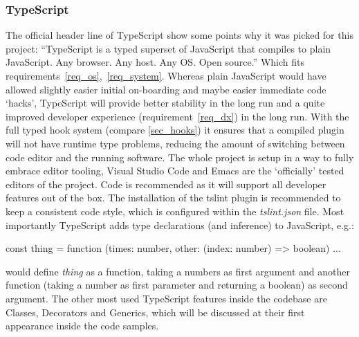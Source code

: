 \subsubsection*{TypeScript}
 The official header line of TypeScript show some points why
  it was picked for this project: ``TypeScript is a typed superset of JavaScript that compiles
  to plain JavaScript. Any browser. Any host. Any OS\@. Open
  source.''\cite{noauthor_typescript_2018} Which fits
  requirements~\ref{req_os},~\ref{req_system}. Whereas plain JavaScript would
  have allowed slightly easier initial on-boarding and maybe easier immediate
  code `hacks', TypeScript will provide better stability in the long run and a
  quite improved developer experience (requirement~\ref{req_dx}) in the long
  run. With the full typed hook system (compare \autoref{sec_hooks}) it ensures
  that a compiled plugin will not have runtime type problems, reducing the
  amount of switching between code editor and the running software. The whole
  project is setup in a way to fully embrace editor tooling, Visual Studio
  Code\cite *{noauthor_visual_nodate} and Emacs\cite*{noauthor_gnu_nodate} are
  the `officially' tested editors of the project. Code is recommended as it will
  support all developer features out of the box. The installation of the
  tslint\cite*{noauthor_tslint_nodate} plugin\cite*{noauthor_tslint_nodate-1} is
  recommended to keep a consistent code style, which is configured within the
  \emph{tslint.json} file. Most importantly TypeScript adds type declarations
  (and inference) to JavaScript, e.g.:
\begin{typescript}
const thing = function (times: number, other: (index: number) => boolean) { ... }
\end{typescript}
would define \emph{thing} as a function, taking a numbers as first argument and
another function (taking a number as first parameter and returning a boolean) as
second argument. The other most used TypeScript features inside the codebase are
Classes\cite*{noauthor_classes_nodate},
Decorators\cite*{noauthor_decorators_nodate} and
Generics\cite*{noauthor_generics_nodate}, which will be discussed at their first
appearance inside the code samples.
